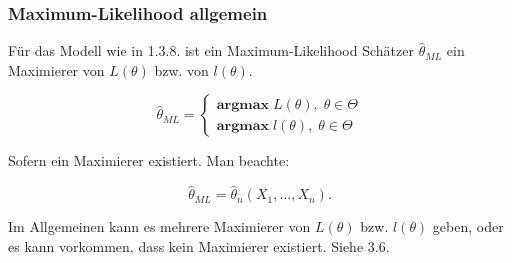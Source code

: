 \documentclass[10pt]{article}
\newcommand{\FZV}{X_1, \ldots, X_n} %
\begin{document}
	
	\subsubsection{Maximum-Likelihood allgemein}
	
	Für das Modell wie in 1.3.8. ist ein Maximum-Likelihood Schätzer $\hat{\theta}_{ML}$ ein Maximierer von $L(\theta)$ bzw. von $l(\theta)$. 
	
	\begin{equation*}
		\hat{\theta}_{ML} =
		\begin{cases}
			\textbf{argmax} \; L(\theta),\; \theta \in \Theta\\
			\textbf{argmax} \; l(\theta),\; \theta \in \Theta
		\end{cases}
	\end{equation*}
	
	Sofern ein Maximierer existiert. 
	Man beachte: 
	
	\begin{equation*}
		\hat{\theta}_{ML} = \hat{\theta}_n (\FZV).
	\end{equation*}
	
	Im Allgemeinen kann es mehrere Maximierer von $L(\theta)$ bzw. $l(\theta)$ geben, oder es kann vorkommen, dass kein Maximierer existiert. Siehe 3.6. 
	
\end{document}
